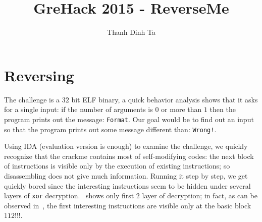\documentclass{easychair}
\begin{document}
\title{GreHack 2015 - ReverseMe}

\author{Thanh Dinh Ta}


\clearpage
\maketitle

\section{Reversing}
The challenge is a $32$ bit ELF binary, a quick behavior analysis shows that it asks for a single input: if the number of arguments is $0$ or more than $1$ then the program prints out the message: \texttt{Format}. Our goal would be to find out an input so that the program prints out some message different than: \texttt{Wrong!}.

Using IDA (evaluation version is enough) to examine the challenge, we quickly recognize that the crackme contains most of self-modifying codes: the next block of instructions is visible only by the execution of existing instructions; so disassembling does not give much information. Running it step by step, we get quickly bored since the interesting instructions seem to be hidden under several layers of \texttt{xor} decryption.~ shows only first $2$ layer of decryption; in fact, as can be observed in~, the first interesting instructions are visible only at the basic block $112$!!!.
\end{document}
